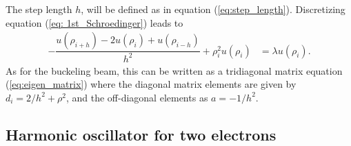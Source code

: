 \documentclass{emulateapj}
\begin{document}
        The step length \(h\), will be defined as in equation (\ref{eq:step_length}). %
        Discretizing equation (\ref{eq: 1st_Schroedinger}) leads to
        \begin{align*}
            -\dfrac{u(\rho_{i + h}) - 2u(\rho_i) + u(\rho_{i - h})}{h^2} + \rho_i^2 u(\rho_i) &= \lambda u(\rho_i).
        \end{align*}
        As for the buckeling beam, this can be written as a tridiagonal matrix equation (\ref{eq:eigen_matrix}) where the diagonal matrix elements are given by \(d_i = 2/h^2 + \rho^{2}\), and the off-diagonal elements as \(a = -1/h^2\). %
    
    \subsection{\textbf{Harmonic oscillator for two electrons}}
        
        
        
\end{document}
